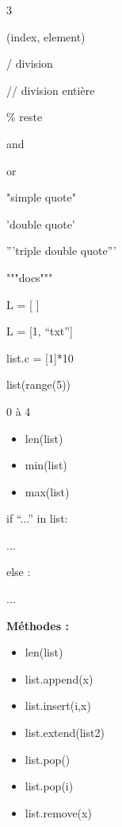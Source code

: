 \documentclass[a4paper,10pt]{article}
\begin{document}
\begin{multicols}{3}
\begin{tcolorbox}[title=Boucles]
(index, element)
\end{tcolorbox}

\columnbreak

\begin{tcolorbox}[title=Division]
/ division

// division entière

\% reste
\end{tcolorbox}

\begin{tcolorbox}[title=Booléens]
and

or
\end{tcolorbox}

\begin{tcolorbox}[title=Chaînes de caractères]
"simple quote"

'double quote'

'''triple double quote'''

"""docs"""
\end{tcolorbox}

\begin{tcolorbox}[title=Lists]
L = [ ]

L = [1, ``txt'']

\vspace{2mm}

list.c = [1]*10

list(range(5))

0 à 4

\vspace{2mm}
\begin{itemize}[leftmargin=5mm]
    \item len(list)
    \item min(list)
    \item max(list)
\end{itemize}

if ``...'' in list:

\hspace*{5mm}...

else :

\hspace*{5mm}...

\vspace{2mm}

\textbf{Méthodes :}

\begin{itemize}[leftmargin=5mm]
    \item len(list)
    \item list.append(x)
    \item list.insert(i,x)
    \item list.extend(list2)
    \item list.pop()
    \item list.pop(i)
    \item list.remove(x)
\end{itemize}
\end{tcolorbox}


\end{multicols}
\end{document}
